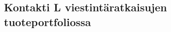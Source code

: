 \documentclass[finnish,12pt,a4paper,pdftex]{article}
\begin{document}








\subsection{Kontakti L viestintäratkaisujen tuoteportfoliossa}
\end{document}
